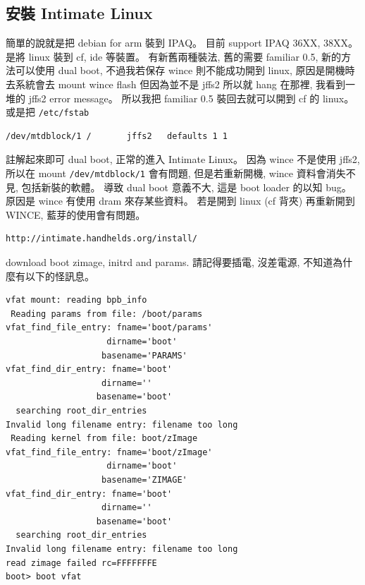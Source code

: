 \documentclass[12pt,a4paper]{article}
\begin{document}
\begin{CJK}{UTF8}{bsmi}
\section{安裝 Intimate Linux}\label{intimate}
簡單的說就是把 debian for arm 裝到 IPAQ。
目前 support IPAQ 36XX, 38XX。
是將 linux 裝到 cf, ide 等裝置。
有新舊兩種裝法, 舊的需要 familiar 0.5,
新的方法可以使用 dual boot,
不過我若保存 wince 則不能成功開到 linux,
原因是開機時去系統會去 mount wince flash 但因為並不是 jffs2 所以就 hang 在那裡,
我看到一堆的 jffs2 error message。
所以我把 familiar 0.5 裝回去就可以開到 cf 的 linux。
或是把 \verb+/etc/fstab+
\begin{verbatim}
/dev/mtdblock/1 /       jffs2   defaults 1 1
\end{verbatim}
註解起來即可 dual boot, 正常的進入 Intimate Linux。
因為 wince 不是使用 jffs2, 所以在 mount \verb+/dev/mtdblock/1+
會有問題, 但是若重新開機, wince 資料會消失不見, 包括新裝的軟體。
導致 dual boot 意義不大, 這是 boot loader 的以知 bug。
原因是 wince 有使用 dram 來存某些資料。
若是開到 linux (cf 背夾) 再重新開到 WINCE,
藍芽的使用會有問題。

\begin{verbatim}
http://intimate.handhelds.org/install/
\end{verbatim}
download boot zimage, initrd and params.
請記得要插電, 沒差電源, 不知道為什麼有以下的怪訊息。


\begin{verbatim}
vfat mount: reading bpb_info                                                    
 Reading params from file: /boot/params                                         
vfat_find_file_entry: fname='boot/params'                                       
                    dirname='boot'                                              
                   basename='PARAMS'                                            
vfat_find_dir_entry: fname='boot'                                               
                   dirname=''                                                   
                  basename='boot'                                               
  searching root_dir_entries                                                    
Invalid long filename entry: filename too long                                  
 Reading kernel from file: boot/zImage                                          
vfat_find_file_entry: fname='boot/zImage'                                       
                    dirname='boot'                                              
                   basename='ZIMAGE'                                            
vfat_find_dir_entry: fname='boot'                                               
                   dirname=''                                                   
                  basename='boot'                                               
  searching root_dir_entries                                                    
Invalid long filename entry: filename too long                                  
read zimage failed rc=FFFFFFFE                                                  
boot> boot vfat     
\end{verbatim}


\end{CJK}
\end{document}
